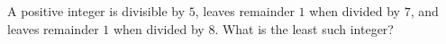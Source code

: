 A positive integer is divisible by $5$, leaves remainder $1$ when divided by $7$, and leaves remainder $1$ when divided by $8$. What is the least such integer?
